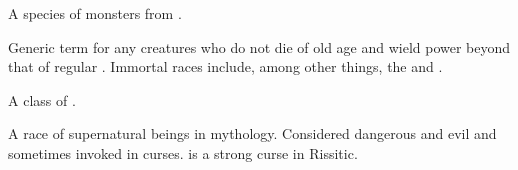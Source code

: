 \begin{gloss}
\begin{comment}
\paragraph{\grimrat}
\end{comment}
\gitem{\grimrat}
A species of monsters from . 









\begin{comment}
\paragraph{immortal}
\end{comment}
Generic term for any creatures who do not die of old age and wield power beyond that of regular . 
Immortal races include, among other things, the \dragons{} and \resphain.  







\begin{comment}
\paragraph{\malach}
\end{comment}
\gitem[\malachim]{\malach}
A class of . 







\begin{comment}
\paragraph{\Maskim}
\end{comment}
\gitem[\Maskim]{\Maskim}
A race of supernatural beings in  mythology. 
Considered dangerous and evil and sometimes invoked in curses. 
 is a strong curse in Rissitic.









\end{gloss}
